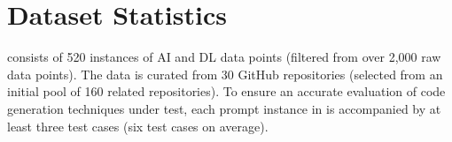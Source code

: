 \section{Dataset Statistics}

% 
%
% 
% 



\tool consists of 520 instances of AI and DL data points (filtered from over 2,000 raw data points). The data is curated from 30 GitHub repositories (selected from an initial pool of 160 related repositories).
To ensure an accurate evaluation of code generation techniques under test,
each prompt instance in \tool is accompanied by
at least three test cases (six test cases on average).

